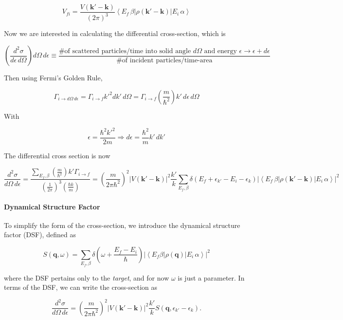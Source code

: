 \documentclass{article}
\begin{document}
			$$V_{fi}=\frac{V(\mathbf{k}'-\mathbf{k})}{(2\pi)^3}\left<E_f\, \beta\left|\rho(\mathbf{k}'-\mathbf{k})\right|E_i\,\alpha\right>$$
			
			
			Now we are interested in calculating the differential cross-section, which is
			
			
			$$\left(\frac{d^2\sigma}{d\epsilon\,d\Omega}\right)d\Omega\, d\epsilon\equiv \frac{\textrm{\# of scattered particles/time into solid angle }d\Omega\textrm{ and energy }\epsilon\to\epsilon+d\epsilon}{\textrm{\# of incident particles/time-area}}$$
			
			
			Then using Fermi's Golden Rule,
			
			
			$$\Gamma_{i\to d\Omega\,d\epsilon}=\Gamma_{i\to f}{k'}^2dk'\,d\Omega=\Gamma_{i\to f}\left(\frac{m}{\hbar^2}\right)k'\,d\epsilon\,d\Omega$$
			
			
			With 
			
			
			$$\epsilon=\frac{\hbar^2{k'}^2}{2m}\Rightarrow d\epsilon=\frac{\hbar^2}{m}k'\,dk'$$
			
			
			The differential cross section is now
			
			
			$$\frac{d^2\sigma}{d\Omega\,d\epsilon}=\frac{\sum_{E_{f}, \beta}\left(\frac{m}{\hbar^2}\right)k'\Gamma_{i\to f}}{\left(\frac{1}{2\pi}\right)^3\left(\frac{\hbar k}{m}\right)}=\left(\frac{m}{2\pi \hbar^2}\right)^2\left|V(\mathbf{k}'-\mathbf{k})\right|^2\frac{k'}{k}\sum_{E_f,\beta}\delta(E_f+\epsilon_{k'}-E_i-\epsilon_k)\left|\left<E_f\,\beta\left|\rho(\mathbf{k}'-\mathbf{k})\right|E_i\,\alpha\right>\right|^2$$
			
			
			\paragraph{Dynamical Structure Factor} To simplify the form of the cross-section, we introduce the dynamical structure factor (DSF), defined as
			
			
			$$S(\mathbf{q},\omega)=\sum_{E_{f},\beta}\delta\left(\omega+\frac{E_f-E_i}{\hbar}\right)\left|\left<E_f\beta\left|\rho(\mathbf{q})\right|E_i\,\alpha\right>\right|^2$$
			
			
			where the DSF pertains only to the \emph{target}, and for now $\omega$ is just a parameter. In terms of the DSF, we can write the cross-section as
			
			\begin{equation} \label{eq:cross-DSF}
			\frac{d^2\sigma}{d\Omega\,d\epsilon} = \left(\frac{m}{2\pi \hbar^2}\right)^2\left|V(\mathbf{k}'-\mathbf{k})\right|^2\frac{k'}{k}S(\mathbf{q},\epsilon_{k'}-\epsilon_{k}).
			\end{equation}
			
\end{document}
